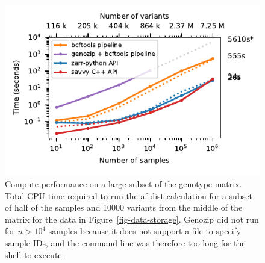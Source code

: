 \documentclass[a4paper,num-refs]{oup-contemporary}
\begin{document}
\begin{figure}
\includegraphics{figures/subset-matrix-compute-supplemental}
\caption{Compute performance on a large subset of the genotype matrix.
Total CPU time required to run the af-dist calculation for
a subset of half of the samples and 10000 variants from the middle of the matrix
for the data in Figure~\ref{fig-data-storage}.
Genozip did not run for
$n > 10^4$ samples because it does not support a file to specify
sample IDs, and the command line was therefore too long for the shell
to execute. 
\label{fig-subset-matrix-compute-supplemental}}
\end{figure}
\end{document}
